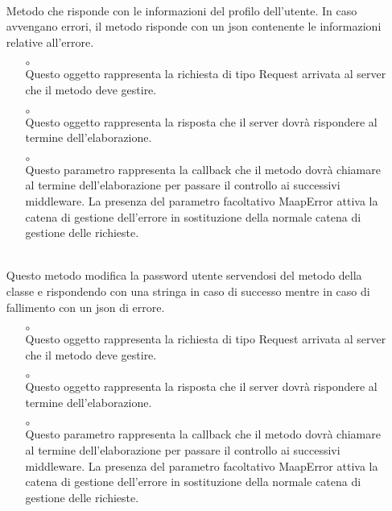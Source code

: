 \begin{itemize}
\begin{itemize}
\end{itemize}
\item[]  \\ Metodo che risponde con le informazioni del profilo dell'utente. In caso avvengano errori, il metodo risponde con un json contenente le informazioni relative all'errore.
\begin{itemize}\addtolength{\itemsep}{-0.5\baselineskip}
\item[$\circ$]  \\ Questo oggetto rappresenta la richiesta di tipo Request arrivata al server che il metodo deve gestire.
\item[$\circ$]  \\ Questo oggetto rappresenta la risposta che il server dovrà rispondere al termine dell'elaborazione.
\item[$\circ$]  \\ Questo parametro rappresenta la callback che il metodo dovrà chiamare al termine dell'elaborazione per passare il controllo ai successivi middleware. La presenza del parametro facoltativo MaapError attiva la catena di gestione dell'errore in sostituzione della normale catena di gestione delle richieste.
\end{itemize}
\item[]  \\ Questo metodo modifica la password utente servendosi del metodo  della classe  e rispondendo con una stringa in caso di successo mentre in caso di fallimento con un json di errore.
\begin{itemize}\addtolength{\itemsep}{-0.5\baselineskip}
\item[$\circ$]  \\ Questo oggetto rappresenta la richiesta di tipo Request arrivata al server che il metodo deve gestire.
\item[$\circ$]  \\ Questo oggetto rappresenta la risposta che il server dovrà rispondere al termine dell'elaborazione.
\item[$\circ$]  \\ Questo parametro rappresenta la callback che il metodo dovrà chiamare al termine dell'elaborazione per passare il controllo ai successivi middleware. La presenza del parametro facoltativo MaapError attiva la catena di gestione dell'errore in sostituzione della normale catena di gestione delle richieste.
\end{itemize}
\end{itemize}

